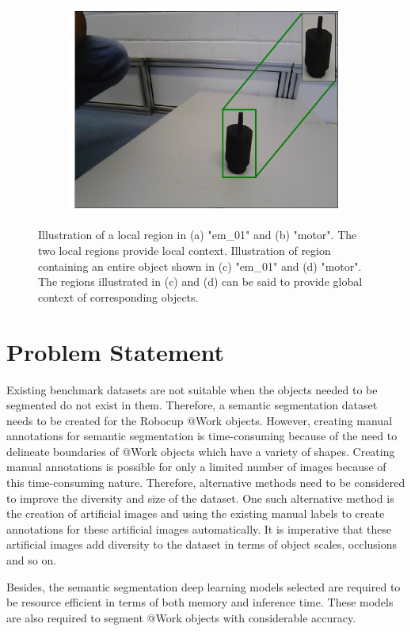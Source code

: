 \begin{figure}[h]
\begin{subfigure}{.4\textwidth}
			\caption{}
			\label{Fig:em01g}
		\end{subfigure}
		\begin{subfigure}{.4\textwidth}
			\centering
			\includegraphics[width=.9\linewidth]{images/motor_context_g}
			\caption{}
			\label{Fig:motorg}
		\end{subfigure}
		\caption{Illustration of a local region in (a) "em\_01" and (b) "motor". The two local regions provide local context. Illustration of region containing an entire object shown in (c) "em\_01" and (d) "motor". The regions illustrated in (c) and (d) can be said to provide global context of corresponding objects.}
		\label{Fig:context}
	\end{figure}

\section{Problem Statement}

Existing benchmark datasets are not suitable when the objects needed to be segmented do not exist in them. Therefore, a semantic segmentation dataset needs to be created for the Robocup @Work objects. However, creating manual annotations for semantic segmentation is time-consuming because of the need to delineate boundaries of @Work objects which have a variety of shapes. Creating manual annotations is possible for only a limited number of images because of this time-consuming nature. Therefore, alternative methods need to be considered to improve the diversity and size of the dataset. One such alternative method is the creation of artificial images and using the existing manual labels to create annotations for these artificial images automatically. It is imperative that these artificial images add diversity to the dataset in terms of object scales, occlusions and so on. 

Besides, the semantic segmentation deep learning models selected are required to be resource efficient in terms of both memory and inference time. These models are also required to segment @Work objects with considerable accuracy.